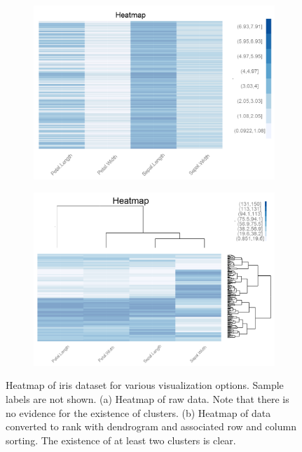 \documentclass[twoside,leqno,twocolumn]{article}
\begin{document}
\begin{figure}[t!]
	\centering
	\begin{subfigure}[t]{0.46\textwidth}
		\includegraphics[width=\textwidth,valign=t]{Figures/Iris/HeatmapRawnodendro.png}
		\subcaption{}
		\label{fig:FigHeatmapRawnodendro}
	\end{subfigure}
	\begin{subfigure}[t]{0.46\textwidth}
		\includegraphics[width=\textwidth,valign=t]{Figures/Iris/HeatmapRanksDendro.png}
		\subcaption{}
		\label{fig:FigHeatmapRanksdendro}
	\end{subfigure}
	\caption{Heatmap of iris dataset for various visualization options. Sample labels are not shown. (a) Heatmap of raw data. Note that there is no evidence for the existence of clusters. (b) Heatmap of data converted to rank with dendrogram and associated row and column sorting. The existence of at least two clusters is clear.}
	\label{fig:FigHeatmap}
\end{figure}
\end{document}
